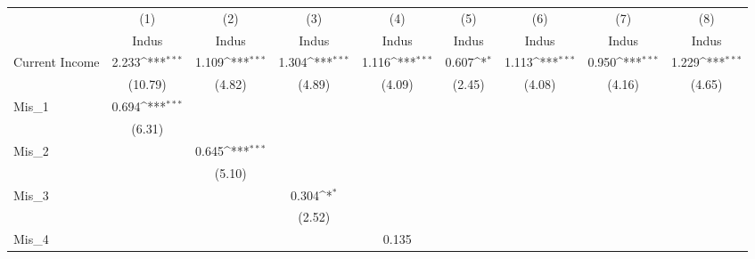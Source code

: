 \documentclass{article}
\begin{document}
{
\def\sym#1{\ifmmode^{#1}\else\(^{#1}\)\fi}
\begin{tabular}{l*{8}{c}}
\hline\hline
            &\multicolumn{1}{c}{(1)}&\multicolumn{1}{c}{(2)}&\multicolumn{1}{c}{(3)}&\multicolumn{1}{c}{(4)}&\multicolumn{1}{c}{(5)}&\multicolumn{1}{c}{(6)}&\multicolumn{1}{c}{(7)}&\multicolumn{1}{c}{(8)}\\
            &\multicolumn{1}{c}{Indus}&\multicolumn{1}{c}{Indus}&\multicolumn{1}{c}{Indus}&\multicolumn{1}{c}{Indus}&\multicolumn{1}{c}{Indus}&\multicolumn{1}{c}{Indus}&\multicolumn{1}{c}{Indus}&\multicolumn{1}{c}{Indus}\\
\hline
Current Income&       2.233\sym{***}&       1.109\sym{***}&       1.304\sym{***}&       1.116\sym{***}&       0.607\sym{*}  &       1.113\sym{***}&       0.950\sym{***}&       1.229\sym{***}\\
            &     (10.79)         &      (4.82)         &      (4.89)         &      (4.09)         &      (2.45)         &      (4.08)         &      (4.16)         &      (4.65)         \\
[1em]
Mis\_1       &       0.694\sym{***}&                     &                     &                     &                     &                     &                     &                     \\
            &      (6.31)         &                     &                     &                     &                     &                     &                     &                     \\
[1em]
Mis\_2       &                     &       0.645\sym{***}&                     &                     &                     &                     &                     &                     \\
            &                     &      (5.10)         &                     &                     &                     &                     &                     &                     \\
[1em]
Mis\_3       &                     &                     &       0.304\sym{*}  &                     &                     &                     &                     &                     \\
            &                     &                     &      (2.52)         &                     &                     &                     &                     &                     \\
[1em]
Mis\_4       &                     &                     &                     &       0.135         &                     &                     &                     &                     \\

\end{tabular}}
\end{document}
